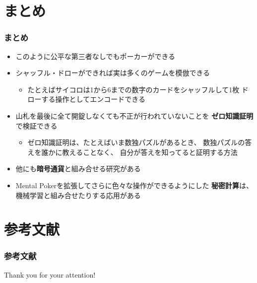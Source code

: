 \section{まとめ}

\begin{frame}
  \frametitle{まとめ}

  \pause
  \begin{itemize}
    \item<+-> このように公平な第三者なしでもポーカーができる
    \item<+-> シャッフル・ドローができれば実は多くのゲームを模倣できる
    \begin{itemize}
      \item たとえばサイコロは1から6までの数字のカードをシャッフルして1枚
      ドローする操作としてエンコードできる
    \end{itemize}

    \item<+-> 山札を最後に全て開錠しなくても不正が行われていないことを
    \textbf{ゼロ知識証明}で検証できる\cite{cmp}
    \begin{itemize}
      \item ゼロ知識証明は、たとえばいま数独パズルがあるとき、
      数独パズルの答えを誰かに教えることなく、
      自分が答えを知ってると証明する方法
    \end{itemize}

    \item<+-> 他にも\textbf{暗号通貨}と組み合せる研究\cite{Kumaresan}がある

    \item<+-> Mental Pokerを拡張してさらに色々な操作ができるようにした
    \textbf{秘密計算}は、機械学習と組み合せたりする応用\cite{ntt}がある
  \end{itemize}
\end{frame}

\section*{参考文献}

\begin{frame}
  \frametitle{参考文献}

  
  
\end{frame}

\begin{frame}
  \centering
  {\Huge Thank you for your attention!}
\end{frame}



